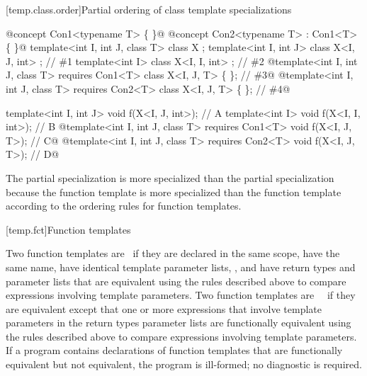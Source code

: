 \documentclass[american]{book}
\begin{document}
\begin{paras}
[temp.class.order]{Partial ordering of class template specializations}
\setcounter{Paras}{1}
\pnum
\enterexample\ 
\begin{codeblock}
@\textcolor{addclr}{concept Con1<typename T> \{ \}}@
@\textcolor{addclr}{concept Con2<typename T> : Con1<T> \{ \}}@
template<int I, int J, class T> class X { };
template<int I, int J>          class X<I, J, int> { }; // \#1
template<int I>                 class X<I, I, int> { }; // \#2
@\textcolor{addclr}{template<int I, int J, class T> requires Con1<T> class X<I, J, T> \{ \}; // \#3}@
@\textcolor{addclr}{template<int I, int J, class T> requires Con2<T> class X<I, J, T> \{ \}; // \#4}@

template<int I, int J> void f(X<I, J, int>);            // \removedConcepts{\#}A
template<int I>        void f(X<I, I, int>);            // \removedConcepts{\#}B
@\textcolor{addclr}{template<int I, int J, class T> requires Con1<T> void f(X<I, J, T>);      // C}@
@\textcolor{addclr}{template<int I, int J, class T> requires Con2<T> void f(X<I, J, T>);      // D}@
\end{codeblock}

The partial specialization
is more specialized than the partial specialization
because the function template
\removedConcepts{\#}
is more specialized than the function template
\removedConcepts{\#}
according to the ordering rules for function templates.
\exitexample\ 

[temp.fct]{Function templates}

\setcounter{Paras}{6}
\pnum
Two function templates are
\ 
if they are declared in the same scope, have the same name, have
identical template parameter lists, \addedConcepts{have identical
  template requirements}, and have return types
  and parameter 
lists that are equivalent using the rules described above to compare
expressions involving
template parameters.
Two function templates are
\ 
\ 
if they are equivalent except that one or more
expressions
that involve template parameters in the return types\addedConcepts{,}  parameter
lists are functionally equivalent using the rules described above to
compare expressions involving
template parameters.
If a program contains declarations of function templates that are
functionally equivalent but not equivalent, the program is ill-formed;
no diagnostic is required.


\end{paras}
\end{document}
